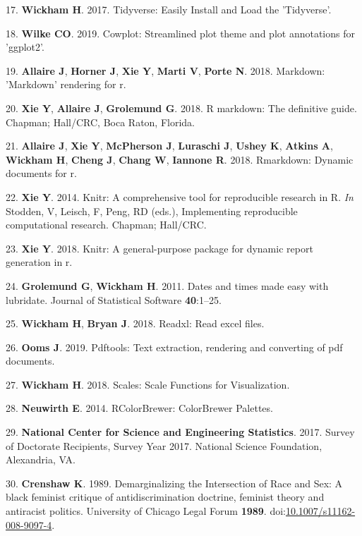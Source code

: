\documentclass[10pt,]{article}
\begin{document}
\hypertarget{ref-wickham_tidyverse_2017}{}
17. \textbf{Wickham H}. 2017. Tidyverse: Easily Install and Load the
'Tidyverse'.

\hypertarget{ref-cowplot}{}
18. \textbf{Wilke CO}. 2019. Cowplot: Streamlined plot theme and plot
annotations for 'ggplot2'.

\hypertarget{ref-markdown}{}
19. \textbf{Allaire J}, \textbf{Horner J}, \textbf{Xie Y}, \textbf{Marti
V}, \textbf{Porte N}. 2018. Markdown: 'Markdown' rendering for r.

\hypertarget{ref-rmd_book}{}
20. \textbf{Xie Y}, \textbf{Allaire J}, \textbf{Grolemund G}. 2018. R
markdown: The definitive guide. Chapman; Hall/CRC, Boca Raton, Florida.

\hypertarget{ref-rmd_rstudio}{}
21. \textbf{Allaire J}, \textbf{Xie Y}, \textbf{McPherson J},
\textbf{Luraschi J}, \textbf{Ushey K}, \textbf{Atkins A},
\textbf{Wickham H}, \textbf{Cheng J}, \textbf{Chang W}, \textbf{Iannone
R}. 2018. Rmarkdown: Dynamic documents for r.

\hypertarget{ref-knitr_2014}{}
22. \textbf{Xie Y}. 2014. Knitr: A comprehensive tool for reproducible
research in R. \emph{In} Stodden, V, Leisch, F, Peng, RD (eds.),
Implementing reproducible computational research. Chapman; Hall/CRC.

\hypertarget{ref-knitr_2018}{}
23. \textbf{Xie Y}. 2018. Knitr: A general-purpose package for dynamic
report generation in r.

\hypertarget{ref-lubridate}{}
24. \textbf{Grolemund G}, \textbf{Wickham H}. 2011. Dates and times made
easy with lubridate. Journal of Statistical Software \textbf{40}:1--25.

\hypertarget{ref-readxl}{}
25. \textbf{Wickham H}, \textbf{Bryan J}. 2018. Readxl: Read excel
files.

\hypertarget{ref-pdftools}{}
26. \textbf{Ooms J}. 2019. Pdftools: Text extraction, rendering and
converting of pdf documents.

\hypertarget{ref-wickham_scales_2018}{}
27. \textbf{Wickham H}. 2018. Scales: Scale Functions for Visualization.

\hypertarget{ref-neuwirth_rcolorbrewer_2014}{}
28. \textbf{Neuwirth E}. 2014. RColorBrewer: ColorBrewer Palettes.

\hypertarget{ref-nsf_survey_2017}{}
29. \textbf{National Center for Science and Engineering Statistics}.
2017. Survey of Doctorate Recipients, Survey Year 2017. National Science
Foundation, Alexandria, VA.

\hypertarget{ref-Crenshaw1989}{}
30. \textbf{Crenshaw K}. 1989. Demarginalizing the Intersection of Race
and Sex: A black feminist critique of antidiscrimination doctrine,
feminist theory and antiracist politics. University of Chicago Legal
Forum \textbf{1989}.
doi:\href{https://doi.org/10.1007/s11162-008-9097-4}{10.1007/s11162-008-9097-4}.
\end{document}
